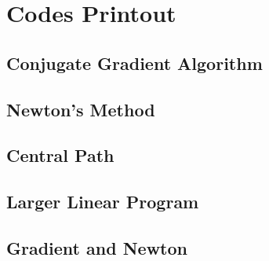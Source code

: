 \documentclass[11pt,a4paper]{article}
\begin{document}
\newpage
\appendix
\section{Codes Printout}

\subsection{Conjugate Gradient Algorithm}


\newpage
\subsection{Newton’s Method}


\newpage
\subsection{Central Path}


\newpage
\subsection{Larger Linear Program}
%

\newpage
\subsection{Gradient and Newton}
%
\end{document}
